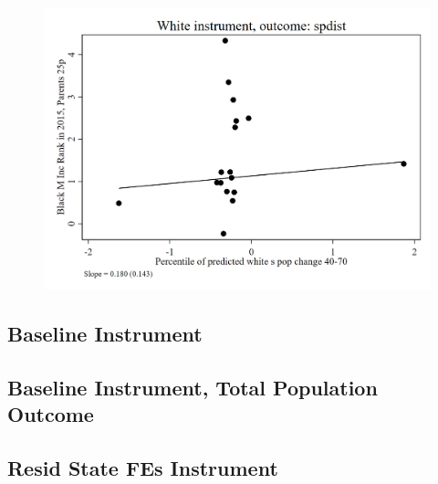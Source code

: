 \documentclass{article}
\begin{document}
\clearpage
\begin{figure}
	\centering
	\includegraphics[width=.8\textwidth]{figures/exogeneity_tests/D14_spdist.png}
\end{figure}
\clearpage


\subsection{Baseline Instrument}



\clearpage



\clearpage


\subsection{Baseline Instrument, Total Population Outcome}



\clearpage



\clearpage

\subsection{Resid State FEs Instrument}



\clearpage

\end{document}
